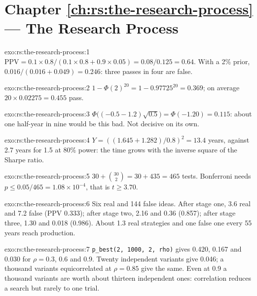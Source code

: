\section*{Chapter \ref{ch:rs:the-research-process} --- The Research Process}

\begin{solution}{exo:rs:the-research-process:1}
$\mathrm{PPV} = 0.1 \times 0.8/(0.1 \times 0.8 + 0.9 \times 0.05) = 0.08/0.125 = 0.64$. With a 2\% prior, $0.016/(0.016 + 0.049) = 0.246$:
three passes in four are false.
\end{solution}

\begin{solution}{exo:rs:the-research-process:2}
$1 - \Phi(2)^{20} = 1 - 0.97725^{20} = 0.369$; on average $20 \times 0.02275 = 0.455$ pass.
\end{solution}

\begin{solution}{exo:rs:the-research-process:3}
$\Phi\bigl((-0.5 - 1.2)\sqrt{0.5}\bigr) = \Phi(-1.20) = 0.115$: about one half-year in nine would be this bad. Not decisive on its own.
\end{solution}

\begin{solution}{exo:rs:the-research-process:4}
$Y = ((1.645 + 1.282)/0.8)^2 = 13.4$ years, against 2.7 years for 1.5 at 80\% power: the time grows with the inverse square of
the Sharpe ratio.
\end{solution}

\begin{solution}{exo:rs:the-research-process:5}
$30 + \binom{30}{2} = 30 + 435 = 465$ tests. Bonferroni needs $p \le 0.05/465 = 1.08 \times 10^{-4}$, that is $t \ge 3.70$.
\end{solution}

\begin{solution}{exo:rs:the-research-process:6}
Six real and 144 false ideas. After stage one, 3.6 real and 7.2 false (PPV 0.333); after stage two, 2.16 and 0.36 (0.857);
after stage three, 1.30 and 0.018 (0.986). About 1.3 real strategies and one false one every 55 years reach production.
\end{solution}

\begin{solution}{exo:rs:the-research-process:7}
\texttt{p\_best(2, 1000, 2, rho)} gives 0.420, 0.167 and 0.030 for $\rho = 0.3$, 0.6 and 0.9. Twenty independent variants give 0.046;
a thousand variants equicorrelated at $\rho = 0.85$ give the same. Even at 0.9 a thousand variants are worth about thirteen
independent ones: correlation reduces a search but rarely to one trial.
\end{solution}

